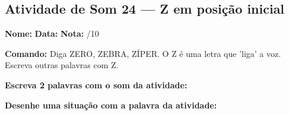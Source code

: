 \subsection{Atividade de Som 24 --- Z em posição inicial}
\begin{exercicio}



\noindent\textbf{Nome:} \underline{\hspace{3.2cm}} \quad \textbf{Data:} \underline{\hspace{1.6cm}} \quad \textbf{Nota:} \underline{\hspace{0.9cm}}/10


\noindent\textbf{Comando:} Diga ZERO, ZEBRA, ZÍPER. O Z é uma letra que 'liga' a voz. Escreva outras palavras com Z.


\begin{center}
\end{center}

\noindent\textbf{Escreva 2 palavras com o som da atividade:}

\begin{center}
  \underline{\hspace{3cm}} \quad \underline{\hspace{3cm}}
\end{center}

\noindent\textbf{Desenhe uma situação com a palavra da atividade:}

\begin{center}
\end{center}

\end{exercicio}



